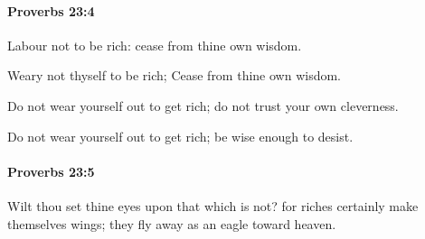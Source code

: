 		\paragraph{Proverbs 23:4} %
			\label{PROVERBS-23-4}

			Labour not to be rich: cease from thine own wisdom.

			\begin{versebox}
					\item[BHS] 
					\item[ASV] Weary not thyself to be rich; Cease from thine own wisdom.
					\item[NIV] Do not wear yourself out to get rich; do not trust your own cleverness.
					\item[NRSV] Do not wear yourself out to get rich; be wise enough to desist.
			\end{versebox}

		\paragraph{Proverbs 23:5} %
			\label{PROVERBS-23-5}

			Wilt thou set thine eyes upon that which is not? for riches certainly make themselves wings; they fly away as an eagle toward heaven.


